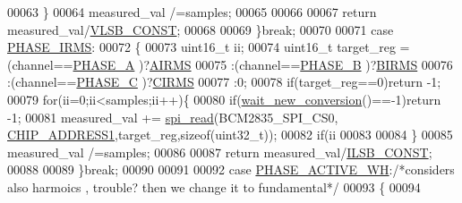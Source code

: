 \begin{DoxyCode}
00063                     \}
00064                     measured\_val /=samples;
00065                     
00066             
00067                     \textcolor{keywordflow}{return} measured\_val/\hyperlink{a00037_aef67453964ff5f4b43fa56b18cee9925}{VLSB\_CONST};
00068                 
00069                 \}\textcolor{keywordflow}{break};
00070 
00071                 \textcolor{keywordflow}{case}  \hyperlink{a00043_a15c9ccf287820001431c33c4bb25a23b}{PHASE\_IRMS}:
00072                 \{
00073                     uint16\_t ii;
00074                     uint16\_t target\_reg =  (channel==\hyperlink{a00043_ad214039f52b011ce2bd6c85ff98a981b}{PHASE\_A} )?\hyperlink{a00036_afae37e821d8947e31a63759e4bb57355}{AIRMS}
00075                                           :(channel==\hyperlink{a00043_ad7b96feed1e1c12515dad5e926b2c62e}{PHASE\_B} )?\hyperlink{a00036_ae1cff66a3f5c466b4344a5c2781224df}{BIRMS}
00076                                           :(channel==\hyperlink{a00043_a3ceb83fb10c2af19b468d508448f24e2}{PHASE\_C} )?\hyperlink{a00036_a3ccd0ef2a55b24f358292694724d37a3}{CIRMS}
00077                                           :0;
00078                     \textcolor{keywordflow}{if}(target\_reg==0)\textcolor{keywordflow}{return} -1;     
00079                     \textcolor{keywordflow}{for}(ii=0;ii<samples;ii++)\{
00080                     \textcolor{keywordflow}{if}(\hyperlink{a00003_ga7b6d584350762c53419945480d6958d3}{wait\_new\_conversion}()==-1)\textcolor{keywordflow}{return} -1;
00081                     measured\_val += \hyperlink{a00007_ga7ad9f65ee46aca507374096506a0b1c4}{spi\_read}(BCM2835\_SPI\_CS0,
      \hyperlink{a00037_a94de2b046db6e10257ef4481c0a15eaa}{CHIP\_ADDRESS1},target\_reg,\textcolor{keyword}{sizeof}(uint32\_t)); 
00082                     \textcolor{keywordflow}{if}(ii%
00083                     
00084                     \}
00085                     measured\_val /=samples;
00086                     
00087                     \textcolor{keywordflow}{return} measured\_val/\hyperlink{a00037_a88b595bff6a462c91ddc1cafbd6e4140}{ILSB\_CONST};
00088                 
00089                 \}\textcolor{keywordflow}{break};
00090                 
00091                 
00092                 \textcolor{keywordflow}{case}  \hyperlink{a00043_a4ee773ad07fa969b9990f9bb3a1a2093}{PHASE\_ACTIVE\_WH}:\textcolor{comment}{/*considers also harmoics , trouble? then we change it
       to fundamental*/}
00093                 \{
00094             

\end{DoxyCode}

